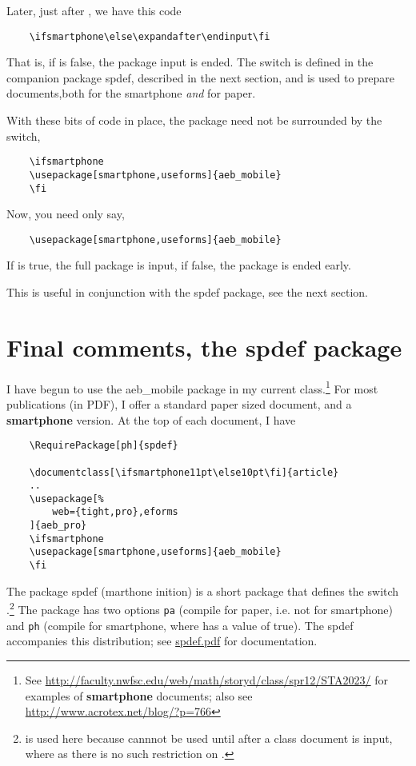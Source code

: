 \documentclass{article}
\begin{document}
Later, just after , we have this code
\begin{verbatim}
    \ifsmartphone\else\expandafter\endinput\fi
\end{verbatim}
That is, if  is false, the package input is ended. The
 switch is defined in the companion package
\textsf{spdef}, described in the next section, and is used to prepare
documents,both for the smartphone \emph{and} for paper.

With these bits of code in place, the package need not be surrounded by
the  switch,
\begin{verbatim}
    \ifsmartphone
    \usepackage[smartphone,useforms]{aeb_mobile}
    \fi
\end{verbatim}
Now, you need only say,
\begin{verbatim}
    \usepackage[smartphone,useforms]{aeb_mobile}
\end{verbatim}
If  is true, the full package is input, if false, the
package is ended early.

This is useful in conjunction with the \textsf{spdef} package, see the next
section.



\section{Final comments, the \textsf{spdef} package}

I have begun to use the \textsf{aeb\_mobile} package in my current
class.\footnote{See
\url{http://faculty.nwfsc.edu/web/math/storyd/class/spr12/STA2023/}
for examples of \textbf{smartphone} documents; also see
\url{http://www.acrotex.net/blog/?p=766}}
For most publications (in PDF), I offer a standard paper sized document,
and a \textbf{smartphone} version. At the top of each document, I have
\begin{verbatim}
    \RequirePackage[ph]{spdef}

    \documentclass[\ifsmartphone11pt\else10pt\fi]{article}
    ..
    \usepackage[%
        web={tight,pro},eforms
    ]{aeb_pro}
    \ifsmartphone
    \usepackage[smartphone,useforms]{aeb_mobile}
    \fi
\end{verbatim}
The package \textsf{spdef} (marthone inition)
is a short package that defines the switch .\footnote{ is used
here because  cannnot be used until after a class document is input, where as
there is no such restriction on .} The package
has two options \texttt{pa} (compile for paper, i.e. not for smartphone)
and \texttt{ph} (compile for smartphone, where  has a
value of true). The \textsf{spdef} accompanies this distribution; see
\href{spdef.pdf}{spdef.pdf} for documentation.
\end{document}
